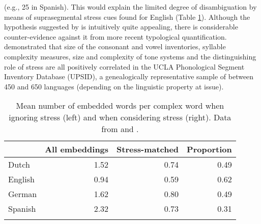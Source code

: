 (e.g., 25 in Spanish). This would explain the limited degree of disambiguation by means of suprasegmental stress cues found for English (Table \ref{tab41}). Although the hypothesis suggested by \citet{cutler_phonemic_2004} is intuitively quite appealing, there is considerable counter-evidence against it from more recent typological quantification. \citet[and references therein]{maddieson_phonological_2011} demonstrated that size of the consonant and vowel inventories, syllable complexity measures, size and complexity of tone systems and the distinguishing role of stress are all positively correlated in the UCLA Phonological Segment Inventory Database (UPSID), a genealogically representative sample of between 450 and 650 languages (depending on the linguistic property at issue).

\begin{table}
\caption{Mean number of embedded words per complex word when ignoring stress (left) and when considering stress (right). Data from \citet{cutler_phonemic_2004} and \citet{cutler_explaining_2006}.}
\label{tab41}
\begin{tabularx}{0.8\textwidth}{Xrrr}
\lsptoprule
& All embeddings & Stress-matched & Proportion\\
\midrule
 Dutch & 1.52 & 0.74 & 0.49\\
 English & 0.94 & 0.59 & 0.62\\
 German & 1.62 & 0.80 & 0.49\\
 Spanish & 2.32 & 0.73 & 0.31\\
\lspbottomrule
\end{tabularx}
\end{table}

